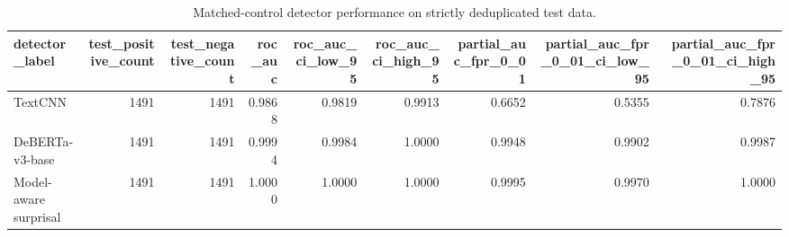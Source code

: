 \begin{table}
\caption{Matched-control detector performance on strictly deduplicated test data.}
\label{tab:v3_detector_main}
\begin{tabular}{lrrrrrrrr}
\toprule
detector\_label & test\_positive\_count & test\_negative\_count & roc\_auc & roc\_auc\_ci\_low\_95 & roc\_auc\_ci\_high\_95 & partial\_auc\_fpr\_0\_01 & partial\_auc\_fpr\_0\_01\_ci\_low\_95 & partial\_auc\_fpr\_0\_01\_ci\_high\_95 \\
\midrule
TextCNN & 1491 & 1491 & 0.9868 & 0.9819 & 0.9913 & 0.6652 & 0.5355 & 0.7876 \\
DeBERTa-v3-base & 1491 & 1491 & 0.9994 & 0.9984 & 1.0000 & 0.9948 & 0.9902 & 0.9987 \\
Model-aware surprisal & 1491 & 1491 & 1.0000 & 1.0000 & 1.0000 & 0.9995 & 0.9970 & 1.0000 \\
\bottomrule
\end{tabular}
\end{table}

